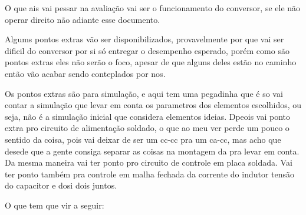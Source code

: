 \documentclass[12pt, a4paper]{article}
\begin{document}
O que ais vai pessar na avaliação vai ser o funcionamento do conversor, se ele não operar direito não adiante esse documento.

Algums pontos extras vão ser disponibilizados, provavelmente por que vai ser dificil do conversor por si só entregar o desempenho esperado, porém como são pontos extras eles não serão o foco, apesar de que alguns deles estão no caminho então vão acabar sendo conteplados por nos.

Os pontos extras são para simulação, e aqui tem uma pegadinha que é so vai contar a simulação que levar em conta os parametros dos elementos escolhidos, ou seja, não é a simulação inicial que considera elementos ideias. Dpeois vai ponto extra pro circuito de alimentação soldado, o que ao meu ver perde um pouco o sentido da coisa, pois vai deixar de ser um cc-cc pra um ca-cc, mas acho que desede que a gente consiga separar as coisas na montagem da pra levar em conta. Da mesma maneira vai ter ponto pro circuito de controle em placa soldada. Vai ter ponto também pra controle em malha fechada da corrente do indutor tensão do capacitor e dosi dois juntos.

O que tem que vir a seguir:
\end{document}

